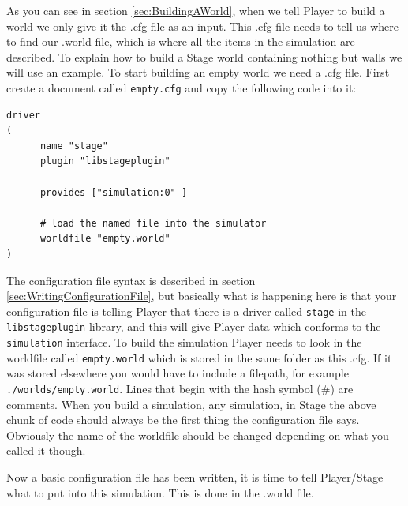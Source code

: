 \documentclass[a4paper]{article}
\newcommand{\plst}{Player/Stage\xspace}
\newcommand{\pl}{Player\xspace}
\begin{document}
As you can see in section \ref{sec:BuildingAWorld}, when we tell \pl to build a world we only give it the .cfg file as an input. This .cfg file needs to tell us where to find our .world file, which is where all the items in the simulation are described. To explain how to build a Stage world containing nothing but walls we will use an example.\newline
To start building an empty world we need a .cfg file. First create a document called \verb|empty.cfg| and copy the following code into it:
\begin{verbatim}
driver
(		
      name "stage"
      plugin "libstageplugin"

      provides ["simulation:0" ]

      # load the named file into the simulator
      worldfile "empty.world"	
)
\end{verbatim}
The configuration file syntax is described in section \ref{sec:WritingConfigurationFile}, but basically what is happening here is that your configuration file is telling \pl that there is a driver called \verb|stage| in the \verb|libstageplugin| library, and this will give \pl data which conforms to the \verb|simulation| interface. To build the simulation \pl needs to look in the worldfile called \verb|empty.world| which is stored in the same folder as this .cfg. If it was stored elsewhere you would have to include a filepath, for example \verb|./worlds/empty.world|. Lines that begin with the hash symbol (\#) are comments.
When you build a simulation, any simulation, in Stage the above chunk of code should always be the first thing the configuration file says. Obviously the name of the worldfile should be changed depending on what you called it though.

Now a basic configuration file has been written, it is time to tell \plst what to put into this simulation. This is done in the .world file. 
\end{document}
